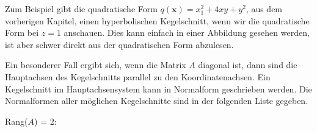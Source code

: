 \vspace{\baselineskip}

Zum Beispiel gibt die quadratische Form \( q(\mathbf{x}) = x_1^2 + 4xy + y^2 \), aus dem vorherigen Kapitel, einen hyperbolischen Kegelschnitt, wenn wir die quadratische Form bei \( z = 1 \) anschauen. Dies kann einfach in einer Abbildung gesehen werden, ist aber schwer direkt aus der quadratischen Form abzulesen. 

\vspace{2\baselineskip}

\begin{figure}[h]
    \centering
\end{figure}

\newpage

Ein besonderer Fall ergibt sich, wenn die Matrix \( A \) diagonal ist, dann sind die Hauptachsen des Kegelschnitts parallel zu den Koordinatenachsen. Ein Kegelschnitt im Hauptachsensystem kann in Normalform geschrieben werden. Die Normalformen aller möglichen Kegelschnitte sind in der folgenden Liste gegeben.

\vspace{\baselineskip}

Rang(\( A \)) = 2:

